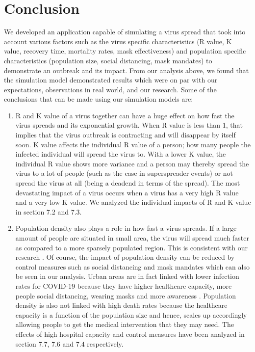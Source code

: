 \documentclass[11pt]{article}
\begin{document}
\section{Conclusion} 
We developed an application capable of simulating a virus spread that took into account various factors such as the virus specific characteristics (R value, K value, recovery time, mortality rates, mask effectiveness) and population specific characteristics (population size, social distancing, mask mandates) to demonstrate an outbreak and its impact. From our analysis above, we found that the simulation model demonstrated results which were on par with our expectations, observations in real world, and our research. Some of the conclusions that can be made using our simulation models are:
\begin{enumerate}
    \item R and K value of a virus together can have a huge effect on how fast the virus spreads and its exponential growth. When R value is less than 1, that implies that the virus outbreak is contracting and will disappear by itself soon. K value affects the individual R value of a person; how many people the infected individual will spread the virus to. With a lower K value, the individual R value shows more variance and a person may thereby spread the virus to a lot of people (such as the case in superspreader events) or not spread the virus at all (being a deadend in terms of the spread). The most devastating impact of a virus occurs when a virus has a very high R value and a very low K value. We analyzed the individual impacts of R and K value in section 7.2 and 7.3. 
    \item Population density also plays a role in how fast a virus spreads. If a large amount of people are situated in small area, the virus will spread much faster as compared to a more sparsely populated region. This is consistent with our research \cite{density}. Of course, the impact of population density can be reduced by control measures such as social distancing and mask mandates which can also be seen in our analysis. Urban areas are in fact linked with lower infection rates for COVID-19 because they have higher healthcare capacity, more people social distancing, wearing masks and more awareness \cite{covid_urban}. Population density is also not linked with high death rates because the healthcare capacity is a function of the population size and hence, scales up accordingly allowing people to get the medical intervention that they may need\cite{covid_lowdeath}. The effects of high hospital capacity and control measures have been analyzed in section 7.7, 7.6 and 7.4 respectively.

\end{enumerate}
\end{document}
